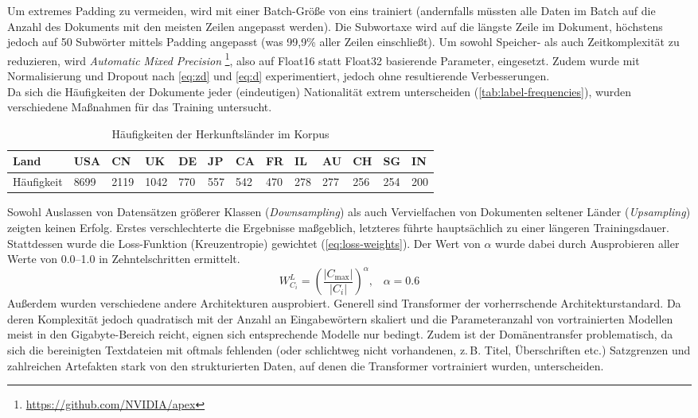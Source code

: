 \documentclass[bachelor,german]{info1thesis}
\begin{document}
Um extremes Padding zu vermeiden, wird mit einer Batch-Größe von eins trainiert (andernfalls müssten alle Daten im Batch auf die Anzahl des Dokuments mit den meisten Zeilen angepasst werden). Die Subwortaxe wird auf die längste Zeile im Dokument, höchstens jedoch auf 50 Subwörter mittels Padding angepasst (was 99,9\% aller Zeilen einschließt). Um sowohl Speicher- als auch Zeitkomplexität zu reduzieren, wird \textit{Automatic Mixed Precision} \footnote{\url{https://github.com/NVIDIA/apex}}, also auf Float16 statt Float32 basierende Parameter, eingesetzt.
Zudem wurde mit Normalisierung und Dropout nach \autoref{eq:zd} und \ref{eq:d} experimentiert, jedoch ohne resultierende Verbesserungen. \\
Da sich die Häufigkeiten der Dokumente jeder (eindeutigen) Nationalität extrem unterscheiden (\autoref{tab:label-frequencies}), wurden verschiedene Maßnahmen für das Training untersucht.
%
\begin{table}[h!]
\begin{tabular}{@{}lllllllllllll@{}}
Land       & USA  & CN   & UK   & DE  & JP  & CA  & FR  & IL  & AU  & CH  & SG  & IN  \\ \midrule
Häufigkeit & 8699 & 2119 & 1042 & 770 & 557 & 542 & 470 & 278 & 277 & 256 & 254 & 200 \\ %
\end{tabular}
\caption{Häufigkeiten der Herkunftsländer im Korpus}
\label{tab:label-frequencies}
\end{table}
%
Sowohl Auslassen von Datensätzen größerer Klassen (\textit{Downsampling}) als auch Vervielfachen von Dokumenten seltener Länder (\textit{Upsampling}) zeigten keinen Erfolg. Erstes verschlechterte die Ergebnisse maßgeblich, letzteres führte hauptsächlich zu einer längeren Trainingsdauer. Stattdessen wurde die Loss-Funktion (Kreuzentropie) gewichtet (\autoref{eq:loss-weights}). Der Wert von $\alpha$ wurde dabei durch Ausprobieren aller Werte von 0.0--1.0 in Zehntelschritten ermittelt.
%
\begin{equation}
W_{C_i}^L = \left(\frac{|C_{\max}|}{|C_i|}\right)^\alpha,\;\;\;\alpha = 0.6 \label{eq:loss-weights}
\end{equation}
%
\newpage
\noindent Außerdem wurden verschiedene andere Architekturen ausprobiert. Generell sind Transformer der vorherrschende Architekturstandard. Da deren Komplexität jedoch quadratisch mit der Anzahl an Eingabewörtern skaliert und die Parameteranzahl von vortrainierten Modellen meist in den Gigabyte-Bereich reicht, eignen sich entsprechende Modelle nur bedingt. Zudem ist der Domänentransfer problematisch, da sich die bereinigten Textdateien mit oftmals fehlenden (oder schlichtweg nicht vorhandenen, z.\,B. Titel, Überschriften etc.) Satzgrenzen und zahlreichen Artefakten stark von den strukturierten Daten, auf denen die Transformer vortrainiert wurden, unterscheiden.
\end{document}

